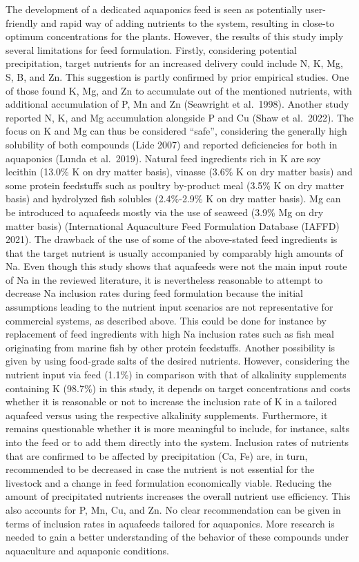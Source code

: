 \documentclass[preprint, 3p,
authoryear]{elsarticle} %
\begin{document}
The development of a dedicated aquaponics feed is seen as potentially
user-friendly and rapid way of adding nutrients to the system, resulting
in close-to optimum concentrations for the plants. However, the results
of this study imply several limitations for feed formulation. Firstly,
considering potential precipitation, target nutrients for an increased
delivery could include N, K, Mg, S, B, and Zn. This suggestion is partly
confirmed by prior empirical studies. One of those found K, Mg, and Zn
to accumulate out of the mentioned nutrients, with additional
accumulation of P, Mn and Zn (Seawright et al.~1998). Another study
reported N, K, and Mg accumulation alongside P and Cu (Shaw et
al.~2022). The focus on K and Mg can thus be considered ``safe'',
considering the generally high solubility of both compounds (Lide 2007)
and reported deficiencies for both in aquaponics (Lunda et al.~2019).
Natural feed ingredients rich in K are soy lecithin (13.0\% K on dry
matter basis), vinasse (3.6\% K on dry matter basis) and some protein
feedstuffs such as poultry by-product meal (3.5\% K on dry matter basis)
and hydrolyzed fish solubles (2.4\%-2.9\% K on dry matter basis). Mg can
be introduced to aquafeeds mostly via the use of seaweed (3.9\% Mg on
dry matter basis) (International Aquaculture Feed Formulation Database
(IAFFD) 2021). The drawback of the use of some of the above-stated feed
ingredients is that the target nutrient is usually accompanied by
comparably high amounts of Na. Even though this study shows that
aquafeeds were not the main input route of Na in the reviewed
literature, it is nevertheless reasonable to attempt to decrease Na
inclusion rates during feed formulation because the initial assumptions
leading to the nutrient input scenarios are not representative for
commercial systems, as described above. This could be done for instance
by replacement of feed ingredients with high Na inclusion rates such as
fish meal originating from marine fish by other protein feedstuffs.
Another possibility is given by using food-grade salts of the desired
nutrients. However, considering the nutrient input via feed (1.1\%) in
comparison with that of alkalinity supplements containing K (98.7\%) in
this study, it depends on target concentrations and costs whether it is
reasonable or not to increase the inclusion rate of K in a tailored
aquafeed versus using the respective alkalinity supplements.
Furthermore, it remains questionable whether it is more meaningful to
include, for instance, salts into the feed or to add them directly into
the system. Inclusion rates of nutrients that are confirmed to be
affected by precipitation (Ca, Fe) are, in turn, recommended to be
decreased in case the nutrient is not essential for the livestock and a
change in feed formulation economically viable. Reducing the amount of
precipitated nutrients increases the overall nutrient use efficiency.
This also accounts for P, Mn, Cu, and Zn. No clear recommendation can be
given in terms of inclusion rates in aquafeeds tailored for aquaponics.
More research is needed to gain a better understanding of the behavior
of these compounds under aquaculture and aquaponic conditions.
\end{document}
